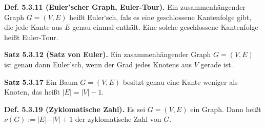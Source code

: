 \textbf{Def. 5.3.11 (Euler\textquoteright{}scher Graph, Euler-Tour).} Ein zusammenhängender Graph $G=(V,E)$ heißt Euler‘sch, fals es eine geschlossene Kantenfolge gibt, die jede Kante aus $E$ genau einmal enthält. Eine solche geschlossene Kantenfolge heißt Euler-Tour.

\textbf{Satz 5.3.12 (Satz von Euler).} Ein zasammenhängender Graph $G=(V,E)$ ist genau dann Euler’sch, wenn der Grad jedes Knotens aus $V$ gerade ist.

\textbf{Satz 5.3.17} Ein Baum $G=(V,E)$ besitzt genau eine Kante
weniger als Knoten, das heißt $\vert E\vert=\vert V\vert-1$.

\textbf{Def. 5.3.19 (Zyklomatische Zahl).} Es sei $G= (V,E)$ ein Graph. Dann heißt $\nu (G):=\vert E \vert - \vert V \vert +1$ der zyklomatische Zahl von $G$.

